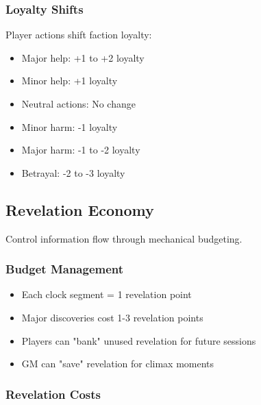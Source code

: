 \begin{description}
\subsubsection{Loyalty Shifts}

Player actions shift faction loyalty:
\begin{itemize}
\item Major help: +1 to +2 loyalty
\item Minor help: +1 loyalty
\item Neutral actions: No change
\item Minor harm: -1 loyalty
\item Major harm: -1 to -2 loyalty
\item Betrayal: -2 to -3 loyalty
\end{itemize}

\subsection{Revelation Economy}

Control information flow through mechanical budgeting.

\subsubsection{Budget Management}

\begin{itemize}
\item Each clock segment = 1 revelation point
\item Major discoveries cost 1-3 revelation points
\item Players can "bank" unused revelation for future sessions
\item GM can "save" revelation for climax moments
\end{itemize}

\subsubsection{Revelation Costs}

\end{description}
